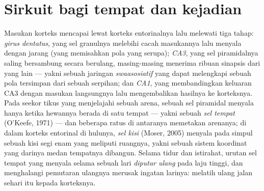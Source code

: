 \section{Sirkuit bagi tempat dan kejadian}

\begin{definition}\label{def:b3:learning-memory:hippocampus}
%
Masukan korteks mencapai  lewat korteks entorinalnya
lalu melewati tiga tahap: \emph{girus dentatus}, yang
sel granulnya melebihi cacah masukannya lalu menyala dengan jarang (yang memisahkan
pola yang serupa); \emph{CA3}, yang sel piramidalnya saling
bersambung secara berulang, masing-masing menerima ribuan sinapsis dari
yang lain --- yakni sebuah jaringan \emph{swaasosiatif} yang dapat melengkapi sebuah
pola tersimpan dari sebuah serpihan; dan \emph{CA1}, yang membandingkan keluaran CA3
dengan masukan langsungnya lalu mengembalikan hasilnya ke korteksnya. Pada seekor tikus
yang menjelajahi sebuah arena, sebuah sel piramidal  menyala hanya ketika
hewannya berada di satu tempat --- yakni sebuah \emph{sel tempat} (O'Keefe, 1971) --- dan
beberapa ratus di antaranya memetakan arenanya; di dalam korteks entorinal di hulunya,
\emph{sel kisi} (Moser, 2005) menyala pada simpul sebuah kisi
segi enam yang meliputi ruangnya, yakni sebuah sistem koordinat yang darinya medan tempatnya
dibangun. Selama tidur dan istirahat, urutan sel tempat yang
menyala selama sebuah lari \emph{diputar ulang} pada laju tinggi, dan menghalangi
pemutaran ulangnya merusak ingatan larinya:  melatih ulang
jalan sehari itu kepada korteksnya.
\end{definition}

